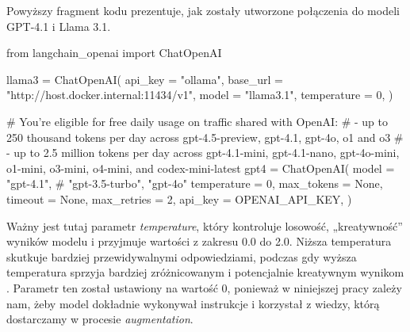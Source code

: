 \documentclass[
a4paper,
12pt,
]{article}
\begin{document}
Powyższy fragment kodu prezentuje, jak zostały utworzone połączenia do modeli\linebreak{} GPT-4.1 i Llama 3.1.

\begin{python}
from langchain_openai import ChatOpenAI

llama3 = ChatOpenAI(
    api_key = "ollama",
    base_url = "http://host.docker.internal:11434/v1",
    model = "llama3.1", 
    temperature = 0,
)

# You're eligible for free daily usage on traffic shared with OpenAI:
# - up to 250 thousand tokens per day across gpt-4.5-preview, gpt-4.1, gpt-4o, o1 and o3
# - up to 2.5 million tokens per day across gpt-4.1-mini, gpt-4.1-nano, gpt-4o-mini, o1-mini, o3-mini, o4-mini, and codex-mini-latest
gpt4 = ChatOpenAI(
    model = "gpt-4.1", # "gpt-3.5-turbo", "gpt-4o"
    temperature = 0,
    max_tokens = None,
    timeout = None,
    max_retries = 2,
    api_key = OPENAI_API_KEY,
)
\end{python}

\noindent{}Ważny jest tutaj parametr \textit{temperature}, który kontroluje losowość, „kreatywność” wyników modelu i przyjmuje wartości z zakresu 0.0 do 2.0. Niższa temperatura skutkuje bardziej przewidywalnymi odpowiedziami, podczas gdy wyższa temperatura sprzyja bardziej zróżnicowanym i potencjalnie kreatywnym wynikom \cite{openai:temperature}. Parametr ten został ustawiony na wartość 0, ponieważ w niniejszej pracy zależy nam, żeby model dokładnie wykonywał instrukcje i korzystał z wiedzy, którą dostarczamy w procesie \textit{augmentation}.




\end{document}
